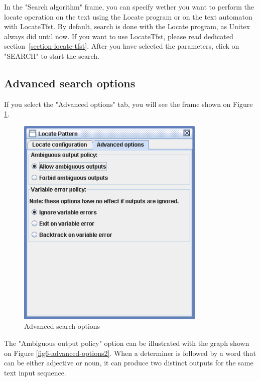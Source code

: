 \bigskip
\noindent
In the "Search algorithm" frame, you can specify wether you want to perform the locate 
operation on the text using the Locate program or on the text automaton with LocateTfst.
By default, search is done with the Locate program, as Unitex always did until now. If you
want to use LocateTfst, please read dedicated section~\ref{section-locate-tfst}.
\bigskip
\noindent
After you have selected the parameters, click on "SEARCH" to start the search.

\clearpage
\subsection{Advanced search options}
\label{section-advanced-search-options}
If you select the "Advanced options" tab, you will see the frame shown on
Figure \ref{fig6-advanced-options1}.

\bigskip
\begin{figure}[!h]
\begin{center}
\includegraphics[width=9cm]{resources/img/fig6-advanced-options1.png}
\caption{Advanced search options\label{fig6-advanced-options1}}
\end{center}
\end{figure}

\noindent The "Ambiguous output policy" option can be illustrated with the
graph shown on Figure \ref{fig6-advanced-options2}. When a determiner is
followed by a word that can be either adjective or noun, it can produce two
distinct outputs for the same text input sequence.


